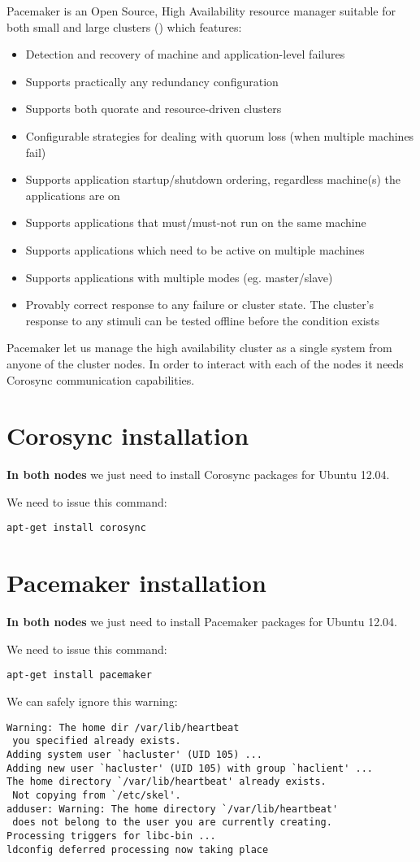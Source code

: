 Pacemaker is an Open Source, High Availability resource manager suitable for both small and large clusters (\cite{PacemakerWebpage}) which features:
\begin{itemize}
  \item Detection and recovery of machine and application-level failures
  \item Supports practically any redundancy configuration
  \item Supports both quorate and resource-driven clusters
  \item Configurable strategies for dealing with quorum loss (when multiple machines fail)
  \item Supports application startup/shutdown ordering, regardless machine(s) the applications are on
  \item Supports applications that must/must-not run on the same machine
  \item Supports applications which need to be active on multiple machines
  \item Supports applications with multiple modes (eg. master/slave)
  \item Provably correct response to any failure or cluster state. The cluster's response to any stimuli can be tested offline before the condition exists
\end{itemize}

Pacemaker let us manage the high availability cluster as a single system from anyone of the cluster nodes. In order to interact with each of the nodes it needs Corosync communication capabilities.

\section {Corosync installation}
\textbf{In both nodes} we just need to install Corosync packages for Ubuntu 12.04.

We need to issue this command:
\begin{verbatim}
apt-get install corosync
\end{verbatim}


\section {Pacemaker installation}
\textbf{In both nodes} we just need to install Pacemaker packages for Ubuntu 12.04.

We need to issue this command:
\begin{verbatim}
apt-get install pacemaker
\end{verbatim}

We can safely ignore this warning:
\begin{verbatim}
Warning: The home dir /var/lib/heartbeat
 you specified already exists.
Adding system user `hacluster' (UID 105) ...
Adding new user `hacluster' (UID 105) with group `haclient' ...
The home directory `/var/lib/heartbeat' already exists.
 Not copying from `/etc/skel'.
adduser: Warning: The home directory `/var/lib/heartbeat'
 does not belong to the user you are currently creating.
Processing triggers for libc-bin ...
ldconfig deferred processing now taking place
\end{verbatim}
